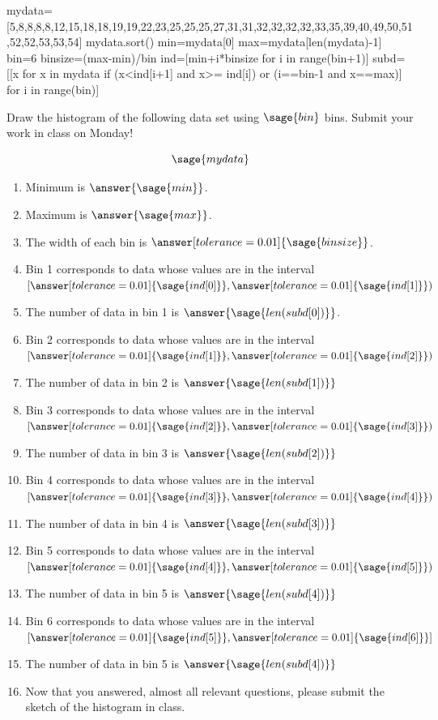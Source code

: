 \documentclass{ximera}
\begin{document}
\begin{problem}
\begin{sagesilent}
mydata=[5,8,8,8,8,12,15,18,18,19,19,22,23,25,25,25,27,31,31,32,32,32,32,33,35,39,40,49,50,51,52,52,53,53,54]
mydata.sort()
min=mydata[0]
max=mydata[len(mydata)-1]
bin=6
binsize=(max-min)/bin
ind=[min+i*binsize for i in range(bin+1)]
subd=[[x for x in mydata if (x<ind[i+1] and x>= ind[i]) or (i==bin-1 and x==max)] for i in range(bin)]
\end{sagesilent}

Draw the histogram of the following data set using $\sage{bin}$ bins. Submit your work in class on Monday!

$$\sage{mydata}$$

\begin{enumerate}
    \item Minimum is $\answer{\sage{min}}$.
    \item Maximum is $\answer{\sage{max}}$.
    \item The width of each bin is $\answer[tolerance=0.01]{\sage{binsize}}$.
    \item Bin 1 corresponds to data whose values are in the interval 
    $[\answer[tolerance=0.01]{\sage{ind[0]}}, \answer[tolerance=0.01]{\sage{ind[1]}})$
    \item The number of data in bin 1 is $\answer{\sage{len(subd[0])}}$.
    \item Bin 2 corresponds to data whose values are in the interval 
    $[\answer[tolerance=0.01]{\sage{ind[1]}}, \answer[tolerance=0.01]{\sage{ind[2]}})$
    \item The number of data in bin 2 is $\answer{\sage{len(subd[1])}}$
    \item Bin 3 corresponds to data whose values are in the interval 
    $[\answer[tolerance=0.01]{\sage{ind[2]}}, \answer[tolerance=0.01]{\sage{ind[3]}})$
    \item The number of data in bin 3 is $\answer{\sage{len(subd[2])}}$
    \item Bin 4 corresponds to data whose values are in the interval 
    $[\answer[tolerance=0.01]{\sage{ind[3]}}, \answer[tolerance=0.01]{\sage{ind[4]}})$
    \item The number of data in bin 4 is $\answer{\sage{len(subd[3])}}$
    \item Bin 5 corresponds to data whose values are in the interval 
    $[\answer[tolerance=0.01]{\sage{ind[4]}}, \answer[tolerance=0.01]{\sage{ind[5]}})$
    \item The number of data in bin 5 is $\answer{\sage{len(subd[4])}}$
    \item Bin 6 corresponds to data whose values are in the interval 
    $[\answer[tolerance=0.01]{\sage{ind[5]}}, \answer[tolerance=0.01]{\sage{ind[6]}}]$
    \item The number of data in bin 5 is $\answer{\sage{len(subd[4])}}$
    \item Now that you answered, almost all relevant questions, please submit the sketch of the histogram in class.
\end{enumerate}
\end{problem}
\end{document}
